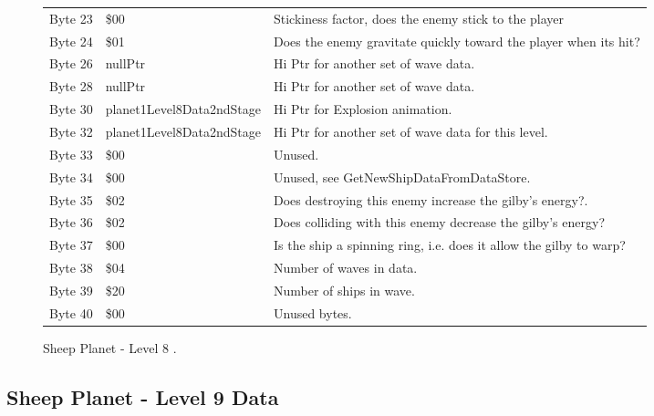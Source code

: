 \begin{figure}[H]
{\begin{adjustbox}{width=12cm}
\begin{tabular}{lll}
 Byte 23 & \$00                       & Stickiness factor, does the enemy stick to the player              \\
 Byte 24 & \$01                       & Does the enemy gravitate quickly toward the player when its hit?   \\
 Byte 26 & nullPtr                   & Hi Ptr for another set of wave data.                               \\
 Byte 28 & nullPtr                   & Hi Ptr for another set of wave data.                               \\
 Byte 30 & planet1Level8Data2ndStage & Hi Ptr for Explosion animation.                                    \\
 Byte 32 & planet1Level8Data2ndStage & Hi Ptr for another set of wave data for this level.                \\
 Byte 33 & \$00                       & Unused.                                                            \\
 Byte 34 & \$00                       & Unused, see GetNewShipDataFromDataStore.                           \\
 Byte 35 & \$02                       & Does destroying this enemy increase the gilby's energy?.           \\
 Byte 36 & \$02                       & Does colliding with this enemy decrease the gilby's energy?        \\
 Byte 37 & \$00                       & Is the ship a spinning ring, i.e. does it allow the gilby to warp? \\
 Byte 38 & \$04                       & Number of waves in data.                                           \\
 Byte 39 & \$20                       & Number of ships in wave.                                           \\
 Byte 40 & \$00                       & Unused bytes.                                                      \\
\bottomrule
\end{tabular}

  \end{adjustbox}

  }\caption*{Sheep Planet - Level 8
.}
\end{figure}

\clearpage
\subsection{Sheep Planet - Level 9 Data}

